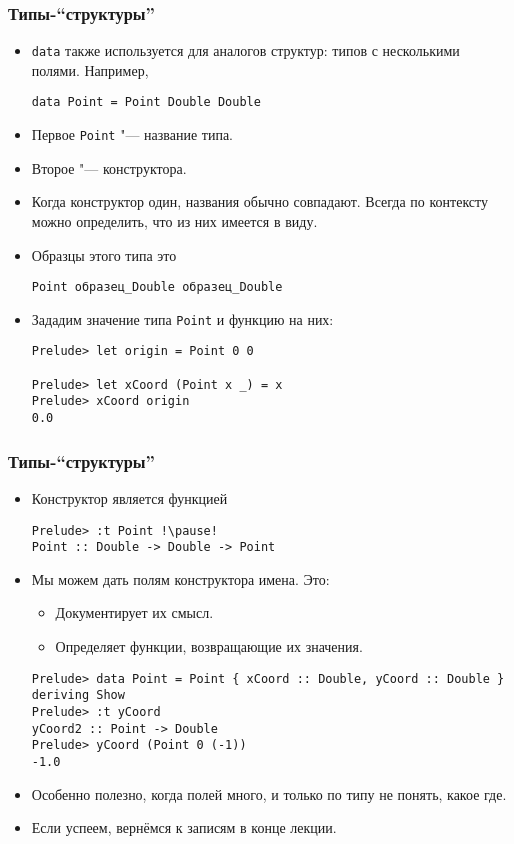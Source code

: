 \documentclass[10pt]{beamer}
\begin{document}
\begin{frame}[fragile]
\frametitle{Типы-\enquote{структуры}}
\begin{itemize}
    \item \lstinline|data| также используется для аналогов структур: типов с несколькими полями. Например,
\begin{lstlisting}[basicstyle=\ttfamily\footnotesize]
data Point = Point Double Double
\end{lstlisting}
    \item Первое \lstinline|Point| "--- название типа.
    \item Второе "--- конструктора.
    \item Когда конструктор один, названия обычно совпадают. Всегда по контексту можно определить, что из них имеется в виду.
    \item Образцы этого типа \pause это\\
\begin{lstlisting}[basicstyle=\ttfamily\footnotesize]
Point образец_Double образец_Double
\end{lstlisting}
    \item Зададим значение типа \lstinline|Point| и функцию на них:
\begin{lstlisting}[basicstyle=\ttfamily\footnotesize]
Prelude> let origin = Point 0 0

Prelude> let xCoord (Point x _) = x
Prelude> xCoord origin
0.0
\end{lstlisting}
\end{itemize}
\end{frame}

\begin{frame}[fragile]
\frametitle{Типы-\enquote{структуры}}
\begin{itemize}
    \item Конструктор является функцией
\begin{lstlisting}
Prelude> :t Point !\pause!
Point :: Double -> Double -> Point
\end{lstlisting}
    \item Мы можем дать полям конструктора имена. Это:\hypertarget{rec1}{}
    \begin{itemize}
        \item Документирует их смысл.
        \item Определяет функции, возвращающие их значения.
    \end{itemize}
\begin{lstlisting}
Prelude> data Point = Point { xCoord :: Double, yCoord :: Double } deriving Show
Prelude> :t yCoord
yCoord2 :: Point -> Double
Prelude> yCoord (Point 0 (-1))
-1.0
\end{lstlisting}
\item Особенно полезно, когда полей много, и только по типу не понять, какое где.
\item Если успеем, вернёмся к записям в конце лекции. \hyperlink{rec2}{}
\end{itemize}
\end{frame}
\end{document}
